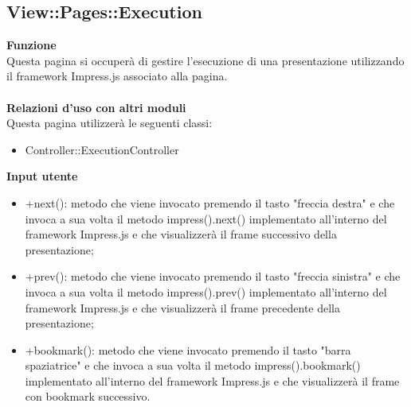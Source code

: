 {\subsection{View::Pages::Execution}{
	\textbf{Funzione}\\
	\indent Questa pagina si occuperà di gestire l'esecuzione di una presentazione utilizzando il framework Impress.js associato alla pagina.\\\\
	\textbf{Relazioni d'uso con altri moduli}\\
	\indent Questa pagina utilizzerà le seguenti classi:
	\begin{itemize}
		\item Controller::ExecutionController
	\end{itemize}
	\textbf{Input utente}
	\begin{itemize}
		\item +next(): metodo che viene invocato premendo il tasto "freccia destra" e che invoca a sua volta il metodo impress().next() implementato all'interno del framework Impress.js e che visualizzerà il frame successivo della presentazione;
		\item +prev(): metodo che viene invocato premendo il tasto "freccia sinistra" e che invoca a sua volta il metodo impress().prev() implementato all'interno del framework Impress.js e che visualizzerà il frame precedente della presentazione;
		\item +bookmark(): metodo che viene invocato premendo il tasto "barra spaziatrice" e che invoca a sua volta il metodo impress().bookmark() implementato all'interno del framework Impress.js e che visualizzerà il frame con bookmark successivo.
	\end{itemize}
}
}
